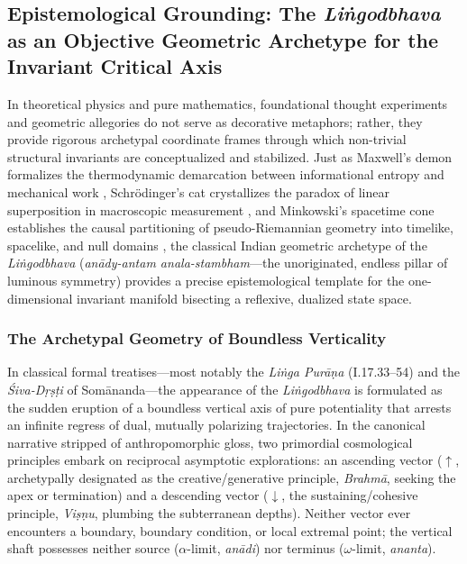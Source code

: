 \documentclass[11pt,a4paper,reqno]{article}
\theoremstyle{plain}
\theoremstyle{definition}
\theoremstyle{remark}
\numberwithin{equation}{section}
\begin{document}
\subsection{Epistemological Grounding: The \emph{Li\.{n}godbhava} as an Objective Geometric Archetype for the Invariant Critical Axis}
\label{subsec:lingodbhava_archetype}

In theoretical physics and pure mathematics, foundational thought experiments and geometric allegories do not serve as decorative metaphors; rather, they provide rigorous archetypal coordinate frames through which non-trivial structural invariants are conceptualized and stabilized. Just as Maxwell's demon formalizes the thermodynamic demarcation between informational entropy and mechanical work \cite{Maxwell1871}, Schr\"{o}dinger's cat crystallizes the paradox of linear superposition in macroscopic measurement \cite{Schrodinger1935}, and Minkowski's spacetime cone establishes the causal partitioning of pseudo-Riemannian geometry into timelike, spacelike, and null domains \cite{Minkowski1908}, the classical Indian geometric archetype of the \emph{Li\.{n}godbhava} (\textit{an\={a}dy-antam anala-stambham}---the unoriginated, endless pillar of luminous symmetry) provides a precise epistemological template for the one-dimensional invariant manifold bisecting a reflexive, dualized state space.

\subsubsection{The Archetypal Geometry of Boundless Verticality}
In classical formal treatises---most notably the \emph{Li\.{n}ga Pur\={a}\d{n}a} (I.17.33--54) and the \emph{\'{S}iva-D\d{r}\d{s}\d{t}i} of Som\={a}nanda---the appearance of the \emph{Li\.{n}godbhava} is formulated as the sudden eruption of a boundless vertical axis of pure potentiality that arrests an infinite regress of dual, mutually polarizing trajectories. In the canonical narrative stripped of anthropomorphic gloss, two primordial cosmological principles embark on reciprocal asymptotic explorations: an ascending vector ($\uparrow$, archetypally designated as the creative/generative principle, \emph{Brahm\={a}}, seeking the apex or termination) and a descending vector ($\downarrow$, the sustaining/cohesive principle, \emph{Vi\d{s}\d{n}u}, plumbing the subterranean depths). Neither vector ever encounters a boundary, boundary condition, or local extremal point; the vertical shaft possesses neither source ($\alpha$-limit, \emph{an\={a}di}) nor terminus ($\omega$-limit, \emph{ananta}). 
\end{document}
